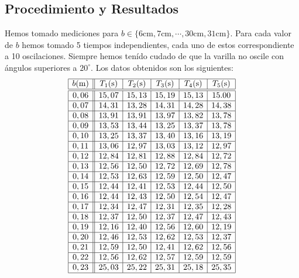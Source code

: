 \documentclass{article}
\begin{document}
\begin{multicols}{2}
\section{Procedimiento y Resultados}
Hemos tomado mediciones para $b\in \{6\text{cm}, 7\text{cm}, \cdots, 30\text{cm}, 31\text{cm}\}$. Para cada valor de $b$ hemos tomado 5 tiempos independientes, cada uno de estos correspondiente a 10 oscilaciones. Siempre hemos tenído cudado de que la varilla no oscile con ángulos superiores a $20^\circ$. Los datos obtenidos son los siguientes:
$$
    \begin{array}{|c||c|c|c|c|c|} \hline
        b\text{(m)} & T_1\text{(s)} & T_2\text{(s)} & T_3\text{(s)} & T_4\text{(s)} & T_5\text{(s)} \\ \hline\hline
        0,06 & 15,07 & 15,13 & 15,19 & 15,13 & 15.00 \\ \hline
        0,07 & 14,31 & 13,28 & 14,31 & 14,28 & 14,38 \\ \hline
        0,08 & 13,91 & 13,91 & 13,97 & 13,82 & 13,78 \\ \hline
        0,09 & 13,53 & 13,44 & 13,25 & 13,37 & 13,78 \\ \hline
        0,10 & 13,25 & 13,37 & 13,40 & 13,16 & 13,19 \\ \hline
        0,11 & 13,06 & 12,97 & 13,03 & 13,12 & 12,97 \\ \hline
        0,12 & 12,84 & 12,81 & 12,88 & 12,84 & 12,72 \\ \hline
        0,13 & 12,56 & 12,50 & 12,72 & 12,69 & 12,78 \\ \hline
        0,14 & 12,53 & 12,63 & 12,59 & 12,50 & 12,47 \\ \hline
        0,15 & 12,44 & 12,41 & 12,53 & 12,44 & 12,50 \\ \hline
        0,16 & 12,44 & 12,43 & 12,50 & 12,54 & 12,47 \\ \hline
        0,17 & 12,34 & 12,47 & 12,31 & 12,35 & 12,28 \\ \hline
        0,18 & 12,37 & 12,50 & 12,37 & 12,47 & 12,43 \\ \hline
        0,19 & 12,16 & 12,40 & 12,56 & 12,60 & 12,19 \\ \hline
        0,20 & 12,46 & 12,53 & 12,62 & 12,53 & 12,37 \\ \hline
        0,21 & 12,59 & 12,50 & 12,41 & 12,62 & 12,56 \\ \hline
        0,22 & 12,56 & 12,62 & 12,57 & 12,59 & 12,59 \\ \hline
        0,23 & 25,03 & 25,22 & 25,31 & 25,18 & 25,35 \\ \hline

\end{array}$$
\end{multicols}
\end{document}
